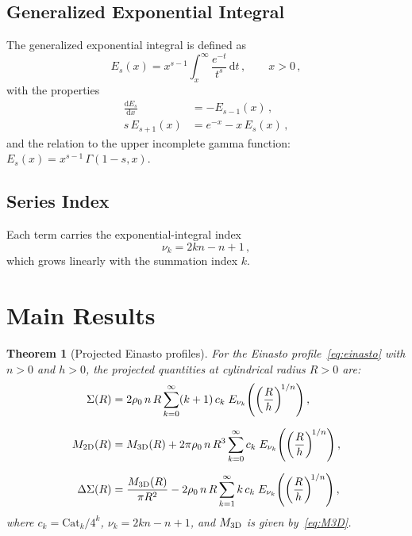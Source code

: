 \documentclass{article}
\newtheorem{theorem}{Theorem}
\begin{document}
\subsection{Generalized Exponential Integral}

The generalized exponential integral is defined as
\begin{equation}\label{eq:Es-def}
E_s(x) = x^{s-1}\int_x^{\infty} \frac{e^{-t}}{t^s}\,\mathrm{d}t\,,
\qquad x>0\,,
\end{equation}
with the properties
\begin{align}
\frac{\mathrm{d}E_s}{\mathrm{d}x} &= -E_{s-1}(x)\,, \label{eq:Es-deriv}\\
s\,E_{s+1}(x) &= e^{-x} - x\,E_s(x)\,, \label{eq:Es-recurrence}
\end{align}
and the relation to the upper incomplete gamma function:
$E_s(x) = x^{s-1}\,\Gamma(1-s,x)$.

\subsection{Series Index}

Each term carries the exponential-integral index
\begin{equation}\label{eq:nuk}
\nu_k = 2kn - n + 1\,,
\end{equation}
which grows linearly with the summation index $k$.

\section{Main Results}
\label{sec:results}

\begin{theorem}[Projected Einasto profiles]\label{thm:main}
For the Einasto profile~\eqref{eq:einasto} with $n>0$ and $h>0$, the
projected quantities at cylindrical radius $R>0$ are:
\begin{align}
\Sigma(R) &= 2\rho_0\, n\, R \sum_{k=0}^{\infty}
(k+1)\,c_k\; E_{\nu_k}\!\left(\left(\frac{R}{h}\right)^{\!1/n}\right),
\label{eq:Sigma}\\[6pt]
M_{\rm 2D}(R) &= M_{\rm 3D}(R) + 2\pi\rho_0\, n\, R^3
\sum_{k=0}^{\infty} c_k\; E_{\nu_k}\!\left(\left(\frac{R}{h}\right)^{\!1/n}\right),
\label{eq:M2D}\\[6pt]
\Delta\Sigma(R) &= \frac{M_{\rm 3D}(R)}{\pi R^2}
- 2\rho_0\, n\, R \sum_{k=1}^{\infty}
k\,c_k\; E_{\nu_k}\!\left(\left(\frac{R}{h}\right)^{\!1/n}\right),
\label{eq:DeltaSigma}
\end{align}
where $c_k=\mathrm{Cat}_k/4^k$, $\nu_k=2kn-n+1$, and $M_{\rm 3D}$ is given
by~\eqref{eq:M3D}.
\end{theorem}
\end{document}
